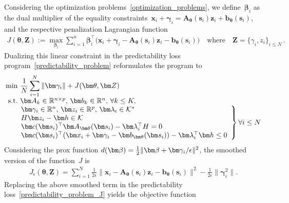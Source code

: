 \documentclass{article}
\theoremstyle{plain}
\begin{document}
Considering the optimization problems~\eqref{optimization_problems}, we define~$\bm \beta_i$ as the dual multiplier of the equality constraints~$\bm x_i + \bm \gamma_{i} = \bm A_{\bm\theta}(\bm s_i)\bm z_i + \bm b_{\bm\theta}(\bm s_i)$, and the respective penalization Lagrangian function 
\begin{align}\label{J}
    J(\bm \theta, \bm Z) := \max_{\bm \beta_i} \sum_{i=1}^n \bm \beta_i^\top \big(\bm x_i + \bm \gamma_{i} - \bm A_{\bm\theta}(\bm s_i)\bm z_i- \bm b_{\bm\theta}(\bm s_i)\big) \quad \text{where} \quad \bm Z = \{\gamma_i,z_i\}_{i\le N}\,.
\end{align}
Dualizing this linear constraint in the predictability loss program~\eqref{predictability_problem} reformulates the program to
\begin{align}\label{predictability_problem_J}
\begin{array}{@{}r@{~}l@{}l}
    \min   & \displaystyle\frac{1}{N} \sum_{i = 1}^N \|\bm \gamma_{i}\| + J(\bm \theta, \bm Z)\\
    \textnormal{s.t.}      &\bm A_k\in\mathbb{R}^{n\times p},\, \bm b_k\in\mathbb{R}^{n},\, \forall k\leq K,\\
    &\left.
    \!\!\!\begin{array}{l}
     \bm\gamma_i\in\mathbb{R}^n,\,\bm z_i\in\mathbb{R}^p,\, \bm \lambda_i \in \mathcal K^*\\
     H\bm z_i - \bm h \in \mathcal{K}\\
          \bm c(\bm s_i)^\top\bm A_{\bm\theta}(\bm s_i) - \bm \lambda_i^\top H = 0 \\
     \bm c(\bm s_i)^\top(\bm x_i+\bm\gamma_{i}-\bm b_{\bm\theta}(\bm s_i)) - \bm \lambda_i^\top \bm h \leq 0\\
     \end{array}
    \right\} \forall i\leq N
    \end{array}
\end{align}
Considering the prox function $d(\bm\beta) = {1\over 2}\|\bm \beta + \bm \gamma_i/\epsilon\|^2$, the smoothed version of the function~$J$ is
    \begin{align}\label{J_eps}
        J_{\epsilon}(\bm\theta,\bm Z) =  \sum_{i=1}^N \frac{1}{2\epsilon} \|\bm x_i - \bm A_{\bm\theta}(\bm s_i)\bm z_i- \bm b_{\bm\theta}(\bm s_i)\|^2 - \frac{1}{2\epsilon}\|\bm \gamma_i^2\|. 
    \end{align}
Replacing the above smoothed term in the predictability loss~\eqref{predictability_problem_J} yields the objective function
\end{document}
